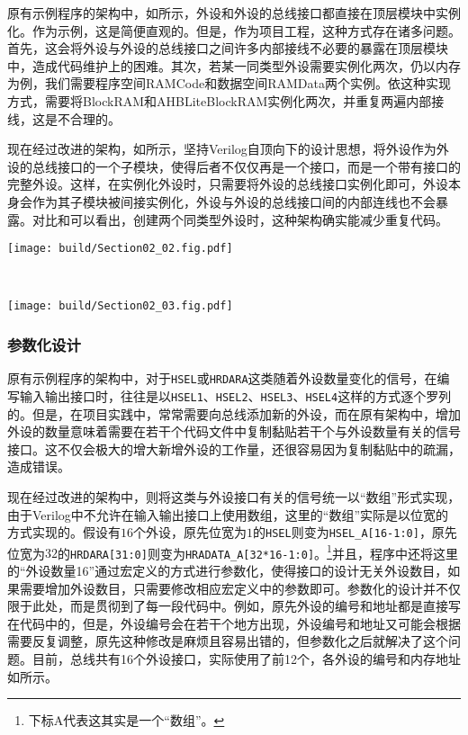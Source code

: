 原有示例程序的架构中，如所示，外设和外设的总线接口都直接在顶层模块中实例化。作为示例，这是简便直观的。但是，作为项目工程，这种方式存在诸多问题。首先，这会将外设与外设的总线接口之间许多内部接线不必要的暴露在顶层模块中，造成代码维护上的困难。其次，若某一同类型外设需要实例化两次，仍以内存为例，我们需要程序空间RAMCode和数据空间RAMData两个实例。依这种实现方式，需要将BlockRAM和AHBLiteBlockRAM实例化两次，并重复两遍内部接线，这是不合理的。

现在经过改进的架构，如所示，坚持Verilog自顶向下的设计思想，将外设作为外设的总线接口的一个子模块，使得后者不仅仅再是一个接口，而是一个带有接口的完整外设。这样，在实例化外设时，只需要将外设的总线接口实例化即可，外设本身会作为其子模块被间接实例化，外设与外设的总线接口间的内部连线也不会暴露。对比和可以看出，创建两个同类型外设时，这种架构确实能减少重复代码。


\begin{Figure}[层次化设计优化]
    \begin{FigureSub}[原有架构]
        \texttt{[image: build/Section02\_02.fig.pdf]}
    \end{FigureSub}\\ \vspace{0.5cm}
    \begin{FigureSub}[现有架构]
        \texttt{[image: build/Section02\_03.fig.pdf]}
    \end{FigureSub}
\end{Figure}

\subsubsection{参数化设计}
原有示例程序的架构中，对于\texttt{HSEL}或\texttt{HRDARA}这类随着外设数量变化的信号，在编写输入输出接口时，往往是以\texttt{HSEL1}、\texttt{HSEL2}、\texttt{HSEL3}、\texttt{HSEL4}这样的方式逐个罗列的。但是，在项目实践中，常常需要向总线添加新的外设，而在原有架构中，增加外设的数量意味着需要在若干个代码文件中复制黏贴若干个与外设数量有关的信号接口。这不仅会极大的增大新增外设的工作量，还很容易因为复制黏贴中的疏漏，造成错误。

现在经过改进的架构中，则将这类与外设接口有关的信号统一以“数组”形式实现，由于Verilog中不允许在输入输出接口上使用数组，这里的“数组”实际是以位宽的方式实现的。假设有$16$个外设，原先位宽为$1$的\texttt{HSEL}则变为\texttt{HSEL\_A[16-1:0]}，原先位宽为$32$的\texttt{HRDARA[31:0]}则变为\texttt{HRADATA\_A[32*16-1:0]}。\footnote{下标A代表这其实是一个“数组”。}并且，程序中还将这里的“外设数量16”通过宏定义的方式进行参数化，使得接口的设计无关外设数目，如果需要增加外设数目，只需要修改相应宏定义中的参数即可。参数化的设计并不仅限于此处，而是贯彻到了每一段代码中。例如，原先外设的编号和地址都是直接写在代码中的，但是，外设编号会在若干个地方出现，外设编号和地址又可能会根据需要反复调整，原先这种修改是麻烦且容易出错的，但参数化之后就解决了这个问题。目前，总线共有16个外设接口，实际使用了前12个，各外设的编号和内存地址如所示。

